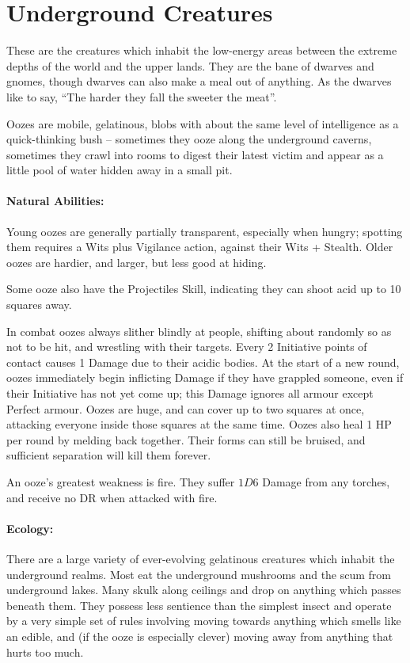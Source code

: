 \section{Underground Creatures}

\begin{multicols}{2}

\noindent
These are the creatures which inhabit the low-energy areas between the extreme depths of the world and the upper lands.
They are the bane of dwarves and gnomes, though dwarves can also make a meal out of anything.
As the dwarves like  to say, ``The harder they fall the sweeter the meat''.

\label{ooze}

Oozes are mobile, gelatinous, blobs with about the same level of intelligence as a quick-thinking bush -- sometimes they ooze along the underground caverns, sometimes they crawl into rooms to digest their latest victim and appear as a little pool of water hidden away in a small pit.

\paragraph{Natural Abilities:} Young oozes are generally partially transparent, especially when hungry; spotting them requires a Wits plus Vigilance action, against their Wits + Stealth.
Older oozes are hardier, and larger, but less good at hiding.

Some ooze also have the Projectiles Skill, indicating they can shoot acid up to 10 squares away.

In combat oozes always slither blindly at people, shifting about randomly so as not to be hit, and wrestling with their targets.
Every 2 Initiative points of contact causes 1 Damage due to their acidic bodies.
At the start of a new round, oozes immediately begin inflicting Damage if they have grappled someone, even if their Initiative has not yet come up; this Damage ignores all armour except Perfect armour.
Oozes are huge, and can cover up to two squares at once, attacking everyone inside those squares at the same time.
Oozes also heal 1 HP per round by melding back together.
Their forms can still be bruised, and sufficient separation will kill them forever.

An ooze's greatest weakness is fire.
They suffer $1D6$ Damage from any torches, and receive no DR when attacked with fire.

\paragraph{Ecology:} There are a large variety of ever-evolving gelatinous creatures which inhabit the underground realms.
Most eat the underground mushrooms and the scum from underground lakes.
Many skulk along ceilings and drop on anything which passes beneath them.
They possess less sentience than the simplest insect and operate by a very simple set of rules involving moving towards anything which smells like an edible, and (if the ooze is especially clever) moving away from anything that hurts too much.


\end{multicols}
